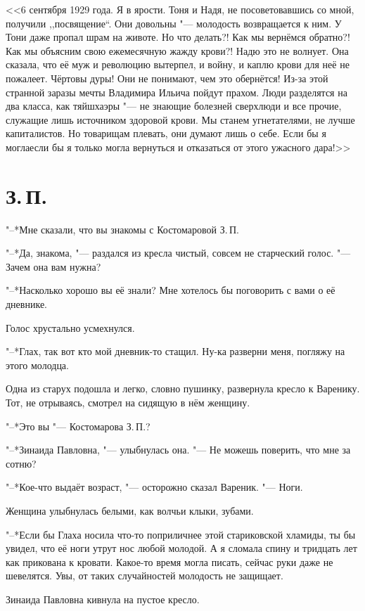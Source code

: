 <<6 сентября 1929 года.
Я в ярости.
Тоня и Надя, не посоветовавшись со мной, получили ,,посвящение``.
Они довольны "--- молодость возвращается к ним.
У Тони даже пропал шрам на животе.
Но что делать?!
Как мы вернёмся обратно?!
Как мы объясним свою ежемесячную жажду крови?!
Надю это не волнует.
Она сказала, что её муж и революцию вытерпел, и войну, и каплю крови для неё не пожалеет.
Чёртовы дуры!
Они не понимают, чем это обернётся!
Из-за этой странной заразы мечты Владимира Ильича пойдут прахом.
Люди разделятся на два класса, как тяйшхаэры "--- не знающие болезней сверхлюди и все прочие, служащие лишь источником здоровой крови.
Мы станем угнетателями, не лучше капиталистов.
Но товарищам плевать, они думают лишь о себе.
Если бы я могла\ldotst если бы я только могла вернуться и отказаться от этого ужасного дара!>>

\section{З.\,П.}

"--*Мне сказали, что вы знакомы с Костомаровой З.\,П.

"--*Да, знакома, "--- раздался из кресла чистый, совсем не старческий голос.
"--- Зачем она вам нужна?

"--*Насколько хорошо вы её знали?
Мне хотелось бы поговорить с вами о её дневнике.

Голос хрустально усмехнулся.

"--*Глах, так вот кто мой дневник-то стащил.
Ну-ка разверни меня, погляжу на этого молодца.

Одна из старух подошла и легко, словно пушинку, развернула кресло к Варенику.
Тот, не отрываясь, смотрел на сидящую в нём женщину.

"--*Это вы "--- Костомарова З.\,П.?

"--*Зинаида Павловна, "--- улыбнулась она.
"--- Не можешь поверить, что мне за сотню?

"--*Кое-что выдаёт возраст, "--- осторожно сказал Вареник.
"--- Ноги.

Женщина улыбнулась белыми, как волчьи клыки, зубами.

"--*Если бы Глаха носила что-то поприличнее этой стариковской хламиды, ты бы увидел, что её ноги утрут нос любой молодой. 
А я сломала спину и тридцать лет как прикована к кровати.
Какое-то время могла писать, сейчас руки даже не шевелятся.
Увы, от таких случайностей молодость не защищает.

Зинаида Павловна кивнула на пустое кресло.

